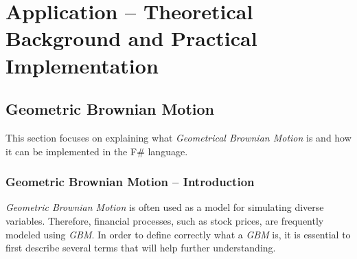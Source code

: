 \chapter{Application -- Theoretical Background and Practical Implementation}

\section{Geometric Brownian Motion}
    This section focuses on explaining what \textit{Geometrical Brownian Motion} is and how it can be implemented in the F\# language.
    
    \subsection{Geometric Brownian Motion -- Introduction}
        \textit{Geometric Brownian Motion} is often used as a model for simulating diverse variables. Therefore, financial processes, such as stock prices, are frequently modeled using \textit{GBM}. In order to define correctly what a \textit{GBM} is, it is essential to first describe several terms that will help further understanding.
    
